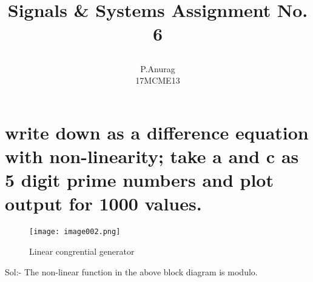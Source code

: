 \documentclass[a4paper,10pt]{article}
\title{
  \begin{large}
    Signals \& Systems
    Assignment No. 6
  \end{large}
}
\author{P.Anurag\\ 17MCME13}
\begin{document}
\maketitle
\section{ write down as a difference equation with non-linearity; take a and c as 5 digit prime numbers and plot output for 1000 values.}
  \begin{figure}[!hbt]
    \centering
      \texttt{[image: image002.png]}
    \caption{Linear congrential generator}
  \end{figure}

  \Large{Sol:- }
  The non-linear function in the above block diagram is modulo.
\end{document}
